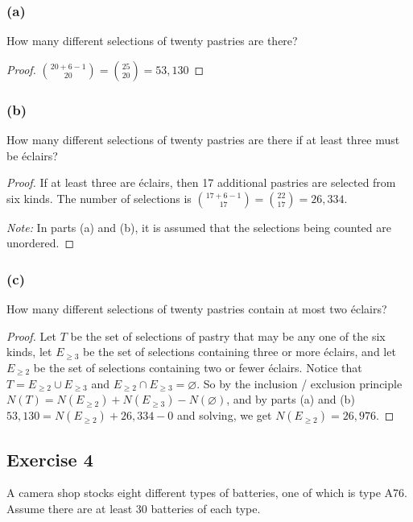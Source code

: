 \documentclass[14pt]{extarticle}
\newcommand{\es}{\varnothing}
\begin{document}
\subsubsection{(a)}
How many different selections of twenty pastries are there?

\begin{proof}
     \(\binom{20+6-1}{20} = \binom{25}{20} = 53,130\)
\end{proof}

\subsubsection{(b)}
How many different selections of twenty pastries are there if at least three must be éclairs?

\begin{proof}
     If at least three are éclairs, then 17 additional pastries are selected from six kinds. The number of selections is
     \(\binom{17+6-1}{17} = \binom{22}{17} = 26,334\).

          {\it Note:} In parts (a) and (b), it is assumed that the selections being counted are unordered.
\end{proof}

\subsubsection{(c)}
How many different selections of twenty pastries contain at most two éclairs?

\begin{proof}
     Let \(T\) be the set of selections of pastry that may be any one of the six kinds, let \(E_{\geq 3}\) be the set of
     selections containing three or more éclairs, and let \(E_{\geq 2}\) be the set of selections containing two or fewer éclairs.
     Notice that \(T = E_{\geq 2} \cup E_{\geq 3}\) and \(E_{\geq 2} \cap E_{\geq 3} = \es\). So by the inclusion / exclusion
     principle \(N(T) = N(E_{\geq 2}) + N(E_{\geq 3}) - N(\es)\), and by parts (a) and (b) \(53,130=N(E_{\geq 2}) + 26,334 - 0\)
     and solving, we get \(N(E_{\geq 2}) = 26,976\).
\end{proof}

\subsection{Exercise 4}
A camera shop stocks eight different types of batteries, one of which is type A76. Assume there are at least 30 batteries
of each type.
\end{document}
